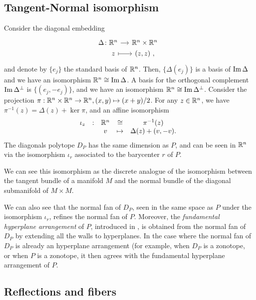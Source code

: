 \subsection{Tangent-Normal isomorphism}

Consider the diagonal embedding
\[
\begin{tikzcd}[row sep=0, column sep=small]
	\Delta \colon \R^n \arrow{r} & \R^n \times \R^n \\
	\phantom{\Delta \colon} z \arrow[r, |->] & (z,z) \ ,
\end{tikzcd}
\]
and denote by $\{e_j\}$ the standard basis of $\mathbb{R}^n$.
Then, $\{\Delta (e_j)\}$ is a basis of $\operatorname{\mathrm{Im}} \Delta$ and we have an isomorphism $\mathbb{R}^n \cong \operatorname{\mathrm{Im}} \Delta$.
A basis for the orthogonal complement $\operatorname{\mathrm{Im}} \Delta^{\bot}$ is $\{(e_j,-e_j)\}$, and we have an isomorphism $\mathbb{R}^n \cong \operatorname{\mathrm{Im}} \Delta^{\bot}$.
Consider the projection $\pi : \mathbb{R}^n \times \mathbb{R}^n \to \mathbb{R}^n, (x,y) \mapsto (x+y)/2$. 
For any $z \in \mathbb{R}^n$, we have $\pi^{-1}(z)=\Delta(z)+\ker \pi$, and an affine isomorphism
\begin{equation} \label{eq:D_P-iso}
	\begin{matrix}
		\iota_z & : & \mathbb{R}^n & \cong & \pi^{-1}(z) \\
		& & v & \mapsto & \Delta(z)+(v,-v).
	\end{matrix}
\end{equation}
The diagonals polytope $D_P$ has the same dimension as $P$, and can be seen in $\mathbb{R}^n$ via the isomorphism $\iota_r$ associated to the barycenter $r$ of $P$.

\begin{remark}
	We can see this isomorphism as the discrete analogue of the isomorphism between the tangent bundle of a manifold $M$ and the normal bundle of the diagonal submanifold of $M\times M$.
\end{remark}

We can also see that the normal fan of $D_P$, seen in the same space as $P$ under the isomorphism $\iota_r$, refines the normal fan of $P$.
Moreover, the \emph{fundamental hyperplane arrangement} of $P$, introduced in \cite[Definition 1.18]{GLA21}, is obtained from the normal fan of $D_P$ by extending all the walls to hyperplanes.
In the case where the normal fan of $D_P$ is already an hyperplane arrangement (for example, when $D_P$ is a zonotope, or when $P$ is a zonotope, it then agrees with the fundamental hyperplane arrangement of $P$.

\subsection{Reflections and fibers}


